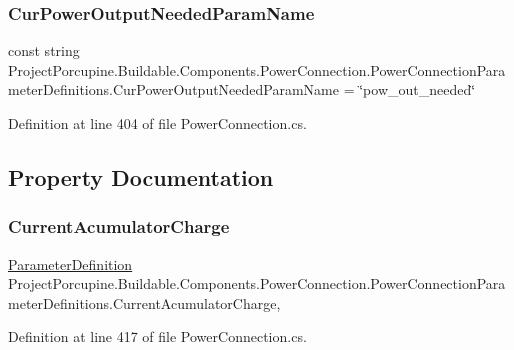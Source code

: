 \subsubsection{\texorpdfstring{Cur\+Power\+Output\+Needed\+Param\+Name}{CurPowerOutputNeededParamName}}
{\footnotesize\ttfamily const string Project\+Porcupine.\+Buildable.\+Components.\+Power\+Connection.\+Power\+Connection\+Parameter\+Definitions.\+Cur\+Power\+Output\+Needed\+Param\+Name = \char`\"{}pow\+\_\+out\+\_\+needed\char`\"{}}



Definition at line 404 of file Power\+Connection.\+cs.



\subsection{Property Documentation}
\mbox{\label{class_project_porcupine_1_1_buildable_1_1_components_1_1_power_connection_1_1_power_connection_parameter_definitions_a8c8c1981be7015f99eab23a9d5d17c5f}} 
\subsubsection{\texorpdfstring{Current\+Acumulator\+Charge}{CurrentAcumulatorCharge}}
{\footnotesize\ttfamily \hyperlink{class_project_porcupine_1_1_buildable_1_1_components_1_1_buildable_component_1_1_parameter_definition}{Parameter\+Definition} Project\+Porcupine.\+Buildable.\+Components.\+Power\+Connection.\+Power\+Connection\+Parameter\+Definitions.\+Current\+Acumulator\+Charge\hspace{0.3cm}{\ttfamily [get]}, {\ttfamily [set]}}



Definition at line 417 of file Power\+Connection.\+cs.

